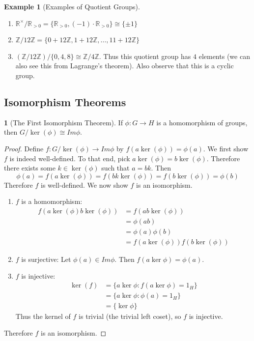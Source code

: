 \documentclass[12pt]{article}
\theoremstyle{definition}
\newtheorem{theorem}{\color{ForestGreen}{\textbf{Theorem}}}
\newtheorem{example}{\color{WildStrawberry}Example}
\theoremstyle{definition}
\begin{document}
\begin{example}[Examples of Quotient Groups]
\begin{enumerate}
	\item $\mathbb{R}^{\times} / \mathbb{R}_{> 0} = \{\mathbb{R}_{> 0}, (-1) \cdot \mathbb{R}_{> 0}\} \cong \{\pm 1\}$
	\item $\mathbb{Z} / 12 \mathbb{Z} = \{0 + 12 \mathbb{Z}, 1 + 12 \mathbb{Z}, \ldots, 11 + 12 \mathbb{Z} \} $
	\item $(\mathbb{Z} / 12 \mathbb{Z}) / \{0, 4, 8 \} \cong \mathbb{Z} / 4 \mathbb{Z}$. Thus this quotient group has $4$ elements (we can also see this from Lagrange's theorem). Also observe that this is a cyclic group.
\end{enumerate}
\end{example}

\subsection{Isomorphism Theorems}

\begin{theorem}[The First Isomorphism Theorem]
If $\phi:G\to H$ is a homomorphism of groups, then $G / \ker(\phi) \cong Im \phi$. 
\end{theorem}

\begin{proof}
Define $f: G / \ker(\phi) \to Im \phi$ by $f(a \ker(\phi)) = \phi(a)$. We first show $f$ is indeed well-defined. To that end, pick $a \ker(\phi) = b \ker(\phi)$. Therefore there exists some $k \in \ker(\phi)$ such that $a = bk$. Then
\begin{equation}
	\phi(a) = f(a \ker(\phi)) = f(bk \ker(\phi)) = f(b \ker(\phi)) = \phi(b)
\end{equation}
Therefore $f$ is well-defined. We now show $f$ is an isomorphism. 

\begin{enumerate}
	\item $f$ is a homomorphism: 
	\begin{align*}
		f(a \ker(\phi) b \ker(\phi)) &= f(ab \ker(\phi)) \\
		&=  \phi(ab) \\
		&= \phi(a)\phi(b) \tag{$\phi$ is a homomorphism} \\
		&= f(a \ker(\phi)) f(b \ker(\phi))
	\end{align*}

	\item $f$ is surjective: Let $\phi(a) \in Im \phi$. Then $f(a \ker \phi) = \phi(a)$. 
	\item $f$ is injective:  
	\begin{align*}
		\ker(f) &= \{a \ker \phi : f(a \ker \phi) = 1_H \} \\
		&= \{a \ker \phi : \phi(a) = 1_H \} \\
		&= \{\ker \phi \} 
	\end{align*}
	Thus the kernel of $f$ is trivial (the trivial left coset), so $f$ is injective. 
\end{enumerate}

Therefore $f$ is an isomorphism.
\end{proof}
\end{document}
